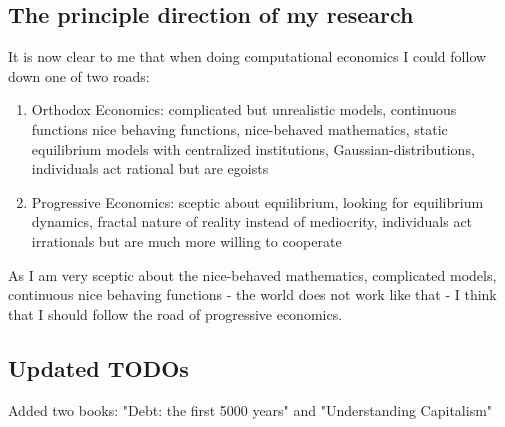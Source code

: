 \subsection*{The principle direction of my research}

It is now clear to me that when doing computational economics I could follow down one of two roads:

\begin{enumerate}
\item Orthodox Economics: complicated but unrealistic models, continuous functions nice behaving functions, nice-behaved mathematics, static equilibrium models with centralized institutions, Gaussian-distributions, individuals act rational but are egoists
\item Progressive Economics: sceptic about equilibrium, looking for equilibrium dynamics, fractal nature of reality instead of mediocrity, individuals act irrationals but are much more willing to cooperate
\end{enumerate}

As I am very sceptic about the nice-behaved mathematics, complicated models, continuous nice behaving functions - the world does not work like that - I think that I should follow the road of progressive economics.

\subsection*{Updated TODOs}
Added two books: "Debt: the first 5000 years" and "Understanding Capitalism"

